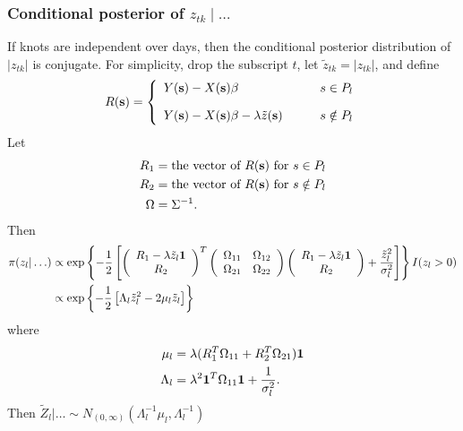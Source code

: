 \subsubsection*{Conditional posterior of $z_{tk} \mid \ldots $}\label{s:mvcondu}
If knots are independent over days, then the conditional posterior distribution of $|z_{tk}|$ is conjugate.
For simplicity, drop the subscript $t$, let $\tilde{z}_{tk} = |z_{tk}|$, and define
\begin{align*}
R(\mbox{\bf s}) = \left\{
    \begin{array}{ll}
        Y(\mbox{\bf s}) - X(\mbox{\bf s}) \beta &s \in P_l\\[1em]
        Y(\mbox{\bf s}) - X(\mbox{\bf s}) \beta - \lambda \tilde{z}(\mbox{\bf s}) \qquad & s \notin P_l
    \end{array}
\right.
\end{align*}
Let
\begin{align*}
    R_1 &= \text{the vector of } R(\mbox{\bf s}) \text{ for } s \in P_l \\
    R_2 &= \text{the vector of } R(\mbox{\bf s}) \text{ for } s \notin P_l \\
    \Omega &= \Sigma^{-1}.
\end{align*}
Then
\begin{align*}
    \pi(z_l | \ldots) &\propto \exp \left\{ -\frac{ 1 }{ 2 } \left[
        \left( \begin{array}{c}
            R_1 - \lambda \tilde{z}_l \mbox{\boldmath $1$}\\
            R_2
        \end{array} \right)^T
        \left( \begin{array}{cc}
            \Omega_{11} & \Omega_{12}\\
            \Omega_{21} & \Omega_{22}
        \end{array} \right)
        \left( \begin{array}{c}
            R_1 - \lambda \tilde{z}_l \mbox{\boldmath $1$}\\
            R_2
        \end{array} \right)
        +  \frac{ {\tilde{z}_l}^2 }{ \sigma_l^2 }\right]
    \right\} I(z_l > 0) \\
        &\propto \exp \left\{ -\frac{ 1 }{ 2 } \left[ \Lambda_l {\tilde{z}_l}^2 - 2 \mu_l \tilde{z}_l \right] \right\}
\end{align*}
where
\begin{align*}
    \mu_l &= \lambda ( R_1^T \Omega_{11} + R_2^T \Omega_{21} )\mbox{\boldmath $1$}\\
    \Lambda_l &= \lambda^2 \mbox{\boldmath $1$}^T \Omega_{11} \mbox{\boldmath $1$} + \frac{ 1 }{ \sigma^2_l }.
\end{align*}
Then $\tilde{Z}_l | \ldots \sim N_{(0, \infty)} (\Lambda_l^{-1} \mu_l, \Lambda_l^{-1})$